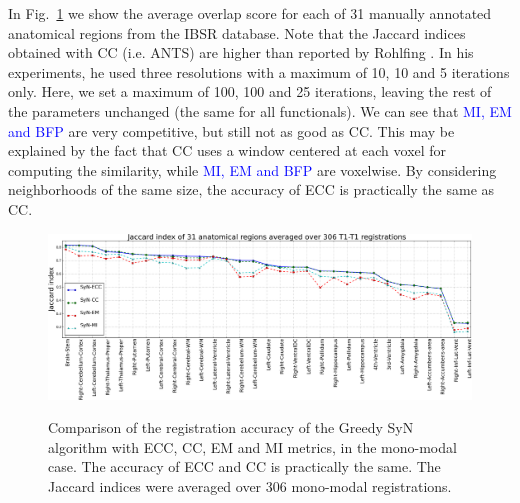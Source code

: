 In \hbox{Fig. \ref{fig:mono_graph_seg}} we show the average overlap score for each of 31 manually annotated anatomical regions from the IBSR database. Note that the Jaccard indices obtained with CC (i.e. ANTS) are higher than reported by Rohlfing \cite{Rohlfing2012}. In his experiments, he used three resolutions with a maximum of 10, 10 and 5 iterations only. Here, we set a maximum of 100, 100 and 25 iterations, leaving the rest of the parameters unchanged (the same for all functionals). We can see that \textcolor{blue}{ MI, EM and BFP } are very competitive, but still not as good as CC. This may be explained by the fact that CC uses a window centered at each voxel for computing the similarity, while \textcolor{blue}{ MI, EM and BFP } are voxelwise. By considering neighborhoods of the same size, the accuracy of ECC is practically the same as CC.
%
%

\begin{figure}[t!]
\centering
\includegraphics[width=0.95\linewidth]{images/mono_lines_seg.png}\\
\caption{{\small Comparison of the registration accuracy of the Greedy SyN algorithm with ECC, CC, EM and MI metrics, in the mono-modal case. The accuracy of ECC and CC is practically the same. The Jaccard indices were averaged over 306 mono-modal registrations.}}
\label{fig:mono_graph_seg}\figcloser
\end{figure}

